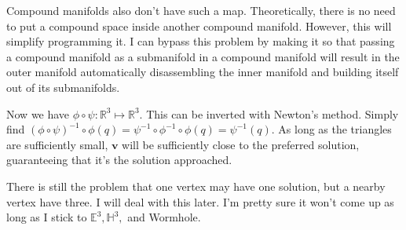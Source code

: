 Compound manifolds also don't have such a map. Theoretically, there is no need to put a compound space inside another compound manifold. However, this will simplify programming it. I can bypass this problem by making it so that passing a compound manifold as a submanifold in a compound manifold will result in the outer manifold automatically disassembling the inner manifold and building itself out of its submanifolds.


Now we have $\phi\circ\psi: \mathbb{R}^3 \mapsto \mathbb{R}^3$. This can be inverted with Newton's method. Simply find $(\phi\circ\psi)^{-1}\circ\phi(q) = \psi^{-1}\circ\phi^{-1}\circ\phi(q) = \psi^{-1}(q)$. As long as the triangles are sufficiently small, $\textbf{v}$ will be sufficiently close to the preferred solution, guaranteeing that it's the solution approached.

There is still the problem that one vertex may have one solution, but a nearby vertex have three. I will deal with this later. I'm pretty sure it won't come up as long as I stick to $\mathbb{E}^3, \mathbb{H}^3,$ and Wormhole.